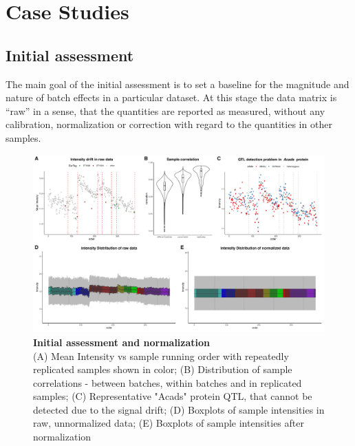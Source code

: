 \documentclass[num-refs]{wiley-article}
\begin{document}
\section{Case Studies}\label{subsec:case_studies}
\subsection{Initial assessment}
The main goal of the initial assessment is to set a baseline for the magnitude and nature of batch effects in a particular dataset. At this stage the data matrix is “raw” in a sense, that the quantities are reported as measured, without any calibration, normalization or correction with regard to the quantities in other samples.


\begin{figure}[hbt]
	\includegraphics[width=\textwidth]{figures/Fig1_initial_assessment_v5_edited.pdf}
	
	\caption{\textbf{Initial assessment and normalization} \\
		\footnotesize
		(A) Mean Intensity vs sample running order with repeatedly replicated samples shown in color; (B) Distribution of sample correlations - between batches, within batches and in replicated samples; (C) Representative "Acads" protein QTL, that cannot be detected due to the signal drift; (D) Boxplots of sample intensities in raw, unnormalized data; (E) Boxplots of sample intensities after normalization}
	\label{fig:batch_fig2_initAssessment}
\end{figure}
\end{document}
